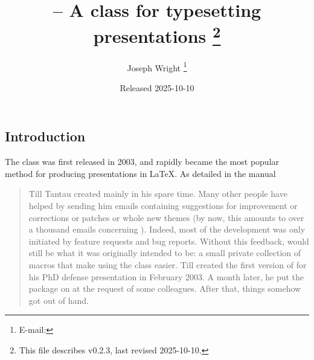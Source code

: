 \documentclass{l3doc}
\makeatletter
\let\acro\@firstofone
\def\filedate{2025-10-10}
\def\fileversion{v0.2.3}
\makeatother
\begin{document}
\title{%
   -- A class for typesetting presentations%
  \thanks{This file describes \fileversion,
    last revised \filedate.}%
}

\author{%
  Joseph Wright%
  \thanks{%
    E-mail: %
  }%
}

\date{Released \filedate}

\maketitle

\tableofcontents

\begin{documentation}

\section{Introduction%
  \label{sec:intro}}

The  class was first released in 2003, and rapidly became the
most popular method for producing presentations in \LaTeX{}. As detailed in
the  manual
\begin{quotation}
  Till Tantau created  mainly in his spare time. Many other people
  have helped by sending him emails containing suggestions for improvement or
  corrections or patches or whole new themes (by now, this amounts to over a
  thousand emails concerning ). Indeed, most of the development was
  only initiated by feature requests and bug reports. Without this feedback,
   would still be what it was originally intended to be: a small
  private collection of macros that make using the  class easier.
  Till created the first version of  for his PhD defense
  presentation in February 2003. A month later, he put the package on
  \acro{ctan} at the request of some colleagues. After that, things somehow got
  out of hand.
\end{quotation}


\end{documentation}
\end{document}
